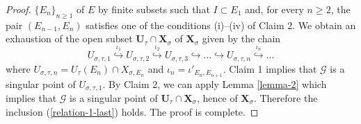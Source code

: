 \documentclass[12pt]{amsart}
\theoremstyle{definition}
\begin{document}
\begin{proof}
$\{E_n\}_{n\geq 1}$ of  $E$ by finite subsets
such that $I\subset E_1$ and, for every $n\geq 2$, the pair $(E_{n-1},E_n)$ satisfies one of the conditions {\rm (i)}--{\rm (iv)} of Claim 2. We obtain an exhaustion of the open subset
$\mathbf{U}_{\tau}\cap\mathbf{X}_\sigma$ of $\mathbf{X}_\sigma$
given by the chain
\[U_{\sigma,\tau,1}\stackrel{\iota_{1}}{\hookrightarrow} U_{\sigma,\tau,2}\stackrel{\iota_{2}}{\hookrightarrow} U_{\sigma,\tau,3}\hookrightarrow\ldots\hookrightarrow U_{\sigma,\tau,n}\stackrel{\iota_n}{\hookrightarrow}\ldots\]
where $U_{\sigma,\tau,n}=U_{\tau}(E_n)\cap X_{\sigma,E_n}$ and
$\iota_n=\iota'_{E_n,E_{n+1}}$. Claim 1 implies that $\mathcal{G}$ is a
singular point of $U_{\sigma,\tau,1}$. By Claim 2,
 we can apply Lemma \ref{lemma-2} which implies that $\mathcal{G}$ is a singular point of $\mathbf{U}_\tau\cap\mathbf{X}_\sigma$, hence of $\mathbf{X}_\sigma$.
Therefore the inclusion  (\ref{relation-1-last}) holds. The proof
is complete.
%
\end{proof}
\end{document}
